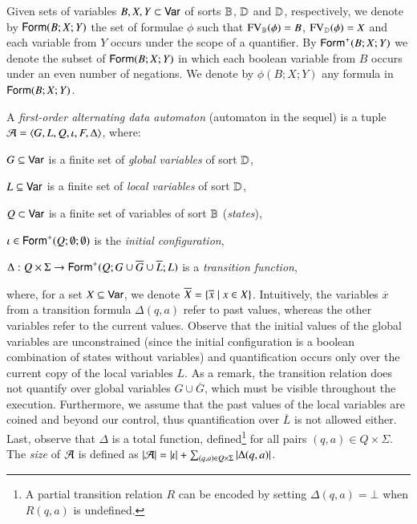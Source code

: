 \documentclass{llncs}
\begin{document}

Given sets of variables $B,X,Y \subset \mathsf{Var}$ of sorts $\mathbb{B}$,
$\mathbb{D}$ and $\mathbb{D}$, respectively, we denote by $\mathsf{Form}(B;X;Y)$ the set
of formulae $\phi$ such that $\mathrm{FV}_{\mathbb{B}}(\phi) = B$, $\mathrm{FV}_{\mathbb{D}}(\phi)
= X$ and each variable from $Y$ occurs under the scope of a
quantifier. By $\mathsf{Form}^+(B;X;Y)$ we denote the subset of $\mathsf{Form}(B;X;Y)$
in which each boolean variable from $B$ occurs under an even number of
negations. We denote by $\phi(B;X;Y)$ any formula in $\mathsf{Form}(B;X;Y)$.

A \emph{first-order alternating data automaton} (automaton in the
sequel) is a tuple $\mathcal{A} = \langle G,L,Q,\iota,F,\Delta \rangle$,
where: \begin{compactitem}
%
\item $G \subseteq \mathsf{Var}$ is a finite set of \emph{global
  variables} of sort $\mathbb{D}$, 
%
\item $L \subseteq \mathsf{Var}$ is a finite set of \emph{local
  variables} of sort $\mathbb{D}$,
%
\item $Q \subset \mathsf{Var}$ is a finite set of variables of sort $\mathbb{B}$
  (\emph{states}),
%
\item $\iota \in \mathsf{Form}^+(Q;\emptyset;\emptyset)$ is the \emph{initial
  configuration},
%
\item $\Delta : Q \times \Sigma \rightarrow
  \mathsf{Form}^+(Q;G\cup\overline{G}\cup\overline{L};L)$ is a
  \emph{transition function},
\end{compactitem}
where, for a set $X \subseteq \mathsf{Var}$, we denote $\overline{X} =
\{ \overline{x} \mid x \in X \}$. Intuitively, the variables
$\overline{x}$ from a transition formula $\Delta(q,a)$ refer to past
values, whereas the other variables refer to the current
values. Observe that the initial values of the global variables are
unconstrained (since the initial configuration is a boolean
combination of states without variables) and quantification occurs
only over the current copy of the local variables $L$. As a remark,
the transition relation does not quantify over global variables $G
\cup \overline{G}$, which must be visible throughout the
execution. Furthermore, we assume that the past values of the local
variables are coined and beyond our control, thus quantification over
$\overline{L}$ is not allowed either. Last, observe that $\Delta$ is a
total function, defined\footnote{A partial transition relation $R$ can
  be encoded by setting $\Delta(q,a) = \bot$ when $R(q,a)$ is
  undefined.} for all pairs $(q,a) \in Q \times \Sigma$. The
\emph{size} of $\mathcal{A}$ is defined as ${|{\mathcal{A}}|} = {|{\iota}|} +
\sum_{(q,a) \in Q\times\Sigma}{|{\Delta(q,a)}|}$.
\end{document}

